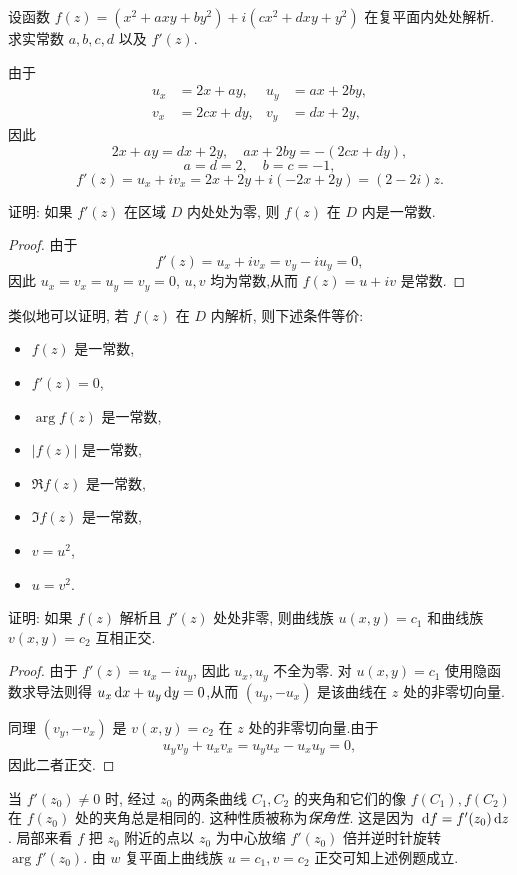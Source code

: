 \begin{example}
	设函数 $f(z)=(x^2+axy+by^2)+i(cx^2+dxy+y^2)$ 在复平面内处处解析. 求实常数 $a,b,c,d$ 以及 $f'(z)$.
\end{example}
\begin{solution}
	由于
	\begin{align*}
		u_x&=2x+ay,&u_y&=ax+2by,\\
		v_x&=2cx+dy,&v_y&=dx+2y,
	\end{align*}
	因此
		\[2x+ay=dx+2y,\quad ax+2by=-(2cx+dy),\]
		\[a=d=2,\quad b=c=-1,\]
		\[f'(z)=u_x+iv_x=2x+2y+i(-2x+2y)=(2-2i)z.\]
\end{solution}

\begin{example}
	证明: 如果 $f'(z)$ 在区域 $D$ 内处处为零, 则 $f(z)$ 在 $D$ 内是一常数.
\end{example}

\begin{proof}
	由于
    \[f'(z)=u_x+iv_x=v_y-iu_y=0,\]
	因此 $u_x=v_x=u_y=v_y=0$, $u,v$ 均为常数,从而  $f(z)=u+iv$ 是常数.
\end{proof}
类似地可以证明, 若 $f(z)$ 在 $D$ 内解析, 则下述条件等价:
\begin{itemize}
	\item $f(z)$ 是一常数,
	\item $f'(z)=0$,
	\item $\arg{f(z)}$ 是一常数,
	\item $|f(z)|$ 是一常数,
	\item $\Re{f(z)}$ 是一常数,
	\item $\Im{f(z)}$ 是一常数,
	\item $v=u^2$,
	\item $u=v^2$.
\end{itemize}

\begin{example}
	证明: 如果 $f(z)$ 解析且 $f'(z)$ 处处非零, 则曲线族 $u(x,y)=c_1$ 和曲线族 $v(x,y)=c_2$ 互相正交.
\end{example}

\begin{proof}
	由于 $f'(z)=u_x-iu_y$, 因此 $u_x,u_y$ 不全为零.
	对 $u(x,y)=c_1$ 使用隐函数求导法则得 $u_x\,\mathrm{d} x+u_y\,\mathrm{d} y=0$,从而 $(u_y,-u_x)$ 是该曲线在 $z$ 处的非零切向量.

	同理 $(v_y,-v_x)$ 是 $v(x,y)=c_2$ 在 $z$ 处的非零切向量.由于
		\[u_yv_y+u_xv_x=u_yu_x-u_xu_y=0,\]
	因此二者正交.
\end{proof}

当 $f'(z_0)\neq 0$ 时, 经过 $z_0$ 的两条曲线 $C_1,C_2$ 的夹角和它们的像 $f(C_1),f(C_2)$ 在 $f(z_0)$ 处的夹角总是相同的.
这种性质被称为\emph{保角性}.
这是因为 $\,\mathrm{d} f=f'(z_0)\,\mathrm{d} z$.
局部来看 $f$ 把 $z_0$ 附近的点以 $z_0$ 为中心放缩 $f'(z_0)$ 倍并逆时针旋转 $\arg{f'(z_0)}$.
由 $w$ 复平面上曲线族 $u=c_1,v=c_2$ 正交可知上述例题成立.

